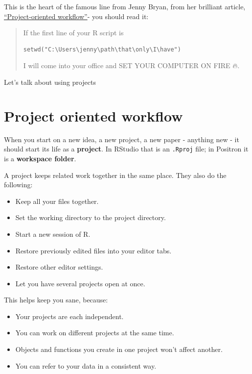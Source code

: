\documentclass[
  letterpaper,
  justified,
  a4paper]{tufte-book}
\providecommand{\tightlist}{%
  \setlength{\itemsep}{0pt}\setlength{\parskip}{0pt}}
\providecommand{\tightlist}{%
  \setlength{\itemsep}{0pt}\setlength{\parskip}{0pt}}
\begin{document}
This is the heart of the famous line from Jenny Bryan, from her
brilliant article,
\href{https://tidyverse.org/blog/2017/12/workflow-vs-script/}{``Project-oriented
workflow''}- you should read it:

\begin{quote}
If the first line of your R script is

\begin{verbatim}
setwd("C:\Users\jenny\path\that\only\I\have")
\end{verbatim}

I will come into your office and SET YOUR COMPUTER ON FIRE 🔥.
\end{quote}

Let's talk about using projects


\chapter{Project oriented workflow}\label{project-oriented-workflow}

When you start on a new idea, a new project, a new paper - anything new
- it should start its life as a \textbf{project}. In RStudio that is an
\texttt{.Rproj} file; in Positron it is a \textbf{workspace folder}.

A project keeps related work together in the same place. They also do
the following:

\begin{itemize}
\tightlist
\item
  Keep all your files together.
\item
  Set the working directory to the project directory.
\item
  Start a new session of R.
\item
  Restore previously edited files into your editor tabs.
\item
  Restore other editor settings.
\item
  Let you have several projects open at once.
\end{itemize}

This helps keep you sane, because:

\begin{itemize}
\tightlist
\item
  Your projects are each independent.
\item
  You can work on different projects at the same time.
\item
  Objects and functions you create in one project won't affect another.
\item
  You can refer to your data in a consistent way.
\end{itemize}
\end{document}
